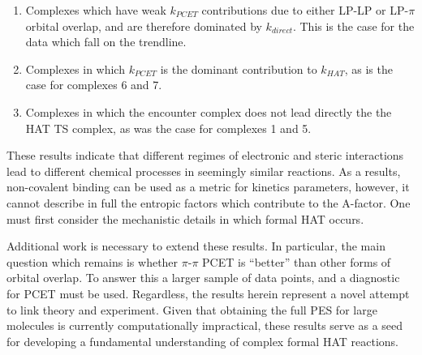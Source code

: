 \begin{enumerate}
  \item Complexes which have weak $k_{PCET}$ contributions due to either LP-LP
	  or LP-$\pi$ orbital overlap, and are therefore dominated by
	  $k_{direct}$. This is the case for the data which fall on the
	  trendline.

  \item Complexes in which $k_{PCET}$ is the dominant contribution to
	  $k_{HAT}$, as is the case for complexes 6 and 7.

  \item Complexes in which the encounter complex does not lead directly the the
  HAT TS complex, as was the case for complexes 1 and 5.  
\end{enumerate}

These results indicate that different regimes of electronic and steric
interactions lead to different chemical processes in seemingly similar
reactions. As a results, non-covalent binding can be used as a metric for
kinetics parameters, however, it cannot describe in full the entropic factors
which contribute to the A-factor. One must first consider the mechanistic
details in which formal HAT occurs.

Additional work is necessary to extend these results. In particular, the main
question which remains is whether $\pi$-$\pi$ PCET is ``better'' than other
forms of orbital overlap. To answer this a larger sample of data points, and a
diagnostic for PCET must be used. Regardless, the results herein represent a
novel attempt to link theory and experiment. Given that obtaining the full PES
for large molecules is currently computationally impractical, these results
serve as a seed for developing a fundamental understanding of complex formal
HAT reactions.
